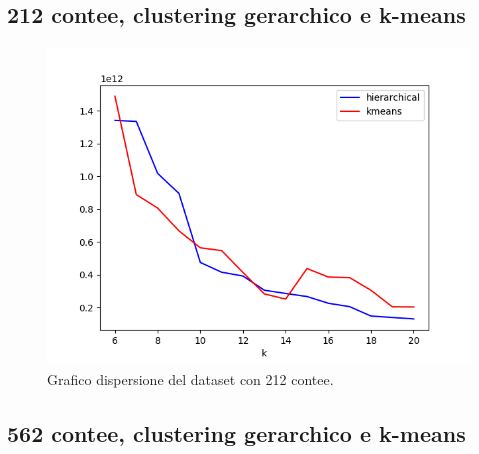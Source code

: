 \documentclass{article}
\begin{document}
\subsection*{212 contee, clustering gerarchico e k-means}
\begin{figure}[H]
	\hspace*{-1cm}\begin{minipage}{0.55\linewidth}
		\centering
			
	\end{minipage}
	\begin{minipage}{0.7\linewidth}
		\includegraphics[width=1.0\linewidth, valign=t]{figures/output562}
		\caption*{Grafico dispersione del dataset con 212 contee.}
	\end{minipage}
\end{figure}
\subsection*{562 contee, clustering gerarchico e k-means}
\end{document}
